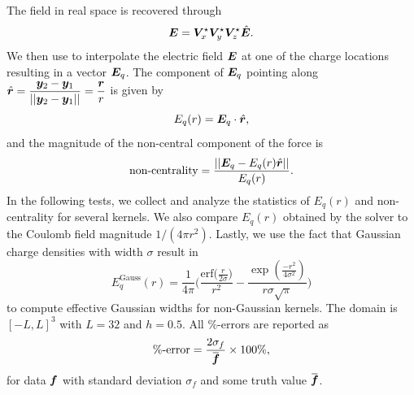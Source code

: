 The field in real space is recovered through
\begin{equation}
\boldsymbol E = \boldsymbol V^{\star}_x \boldsymbol V^{\star}_y \boldsymbol V^{\star}_z \hat{\boldsymbol E}.
\end{equation}
We then use  to interpolate the electric field $\boldsymbol E$ at one of the charge locations resulting in a vector $\boldsymbol E_q$. The component of $\boldsymbol E_q$ pointing along $\hat{\boldsymbol r} = \displaystyle \frac{\boldsymbol y_2 - \boldsymbol y_1}{||\boldsymbol y_2-\boldsymbol y_1||} = \frac{\boldsymbol r}{r}$ is given by 
\begin{equation}
E_q(r) = \boldsymbol E_q \cdot \hat{\boldsymbol r},
\end{equation}
and the magnitude of the non-central component of the force is
\begin{equation}
\text{non-centrality} = \displaystyle \frac{||\boldsymbol E_q - E_q(r)\hat{\boldsymbol r}||}{E_q(r)}.
\end{equation}
In the following tests, we collect and analyze the statistics of $E_q(r)$ and non-centrality for several kernels. We also compare $E_q(r)$ obtained by the solver to the Coulomb field magnitude $1/(4\pi r^2)$. Lastly, we use the fact that Gaussian charge densities with width $\sigma$ result in 
\begin{equation}\label{egauss}
E_q^{\text{Gauss}}(r) = \displaystyle \frac{1}{4\pi} \Big(\frac{\text{erf}\big(\frac{r}{2\sigma}\big)}{r^2} - \frac{\exp(\frac{-r^2}{4\sigma^2})}{r\sigma \sqrt{\pi}}\Big)
\end{equation}
to compute effective Gaussian widths for non-Gaussian kernels. The domain is $[-L,L]^3$ with $L=32$ and $h=0.5$. All $\%$-errors are reported as 
\begin{equation}\label{pererr}
\text{\%-error} =\displaystyle  \frac{2\sigma_f}{\overbar{\bs f}}\times 100\%, 
\end{equation}
for data $\boldsymbol f$ with standard deviation $\sigma_f$ and some truth value $\overbar{\bs f}$.

